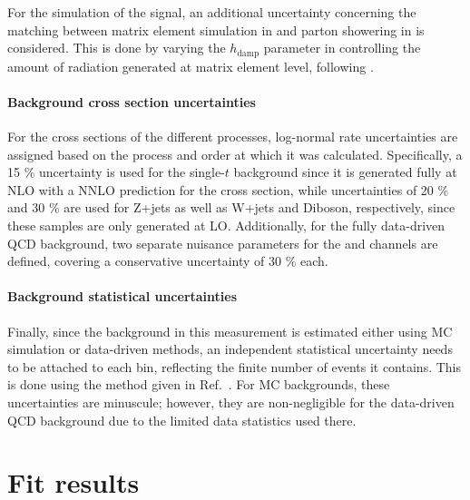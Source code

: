 For the simulation of the \ttbar signal, an additional uncertainty concerning the matching between matrix element simulation in \powheg and parton showering in \pythia is considered. This is done by varying the $h_{\mathrm{damp}}$ parameter in \powheg controlling the amount of radiation generated at matrix element level, following .

\paragraph{Background cross section uncertainties}

For the cross sections of the different processes, log-normal rate uncertainties are assigned based on the process and order at which it was calculated. Specifically, a 15 \% uncertainty is used for the {single-$t$} background since it is generated fully at NLO with a NNLO prediction for the cross section, while uncertainties of 20 \% and 30 \% are used for Z+jets as well as W+jets and Diboson, respectively, since these samples are only generated at LO. Additionally, for the fully data-driven QCD background, two separate nuisance parameters for the \ejets and \mujets channels are defined, covering a conservative uncertainty of 30 \% each.

\paragraph{Background statistical uncertainties}

Finally, since the background in this measurement is estimated either using MC simulation or data-driven methods, an independent statistical uncertainty needs to be attached to each bin, reflecting the finite number of events it contains. This is done using the method given in Ref.~\cite{Barlow:1993dm}. For MC backgrounds, these uncertainties are minuscule; however, they are non-negligible for the data-driven QCD background due to the limited data statistics used there.


\section{Fit results}
\label{sec:ttxs:fitresults}

